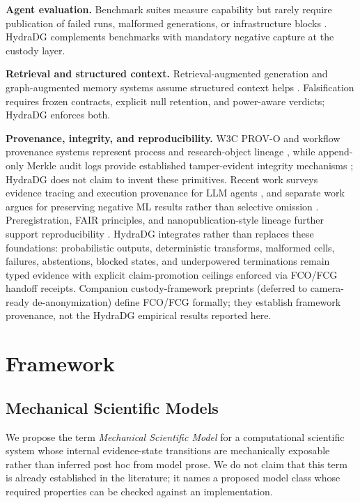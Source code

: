 \documentclass{article}
\begin{document}
\textbf{Agent evaluation.} Benchmark suites measure capability but rarely require publication of failed runs, malformed generations, or infrastructure blocks \cite{liu2023agentbench,zhou2023webarena}.
HydraDG complements benchmarks with mandatory negative capture at the custody layer.

\textbf{Retrieval and structured context.} Retrieval-augmented generation and graph-augmented memory systems assume structured context helps \cite{lewis2020rag,edge2024graphrag}.
Falsification requires frozen contracts, explicit null retention, and power-aware verdicts; HydraDG enforces both.

\textbf{Provenance, integrity, and reproducibility.}
W3C PROV-O and workflow provenance systems represent process and research-object lineage \cite{lebo2013provo,khan2019cwlprov}, while append-only Merkle audit logs provide established tamper-evident integrity mechanisms \cite{laurie2013ct}; HydraDG does not claim to invent these primitives.
Recent work surveys evidence tracing and execution provenance for LLM agents \cite{wang2026agentprovenance}, and separate work argues for preserving negative ML results rather than selective omission \cite{karl2024negative}.
Preregistration, FAIR principles, and nanopublication-style lineage further support reproducibility \cite{nosek2018prereg,wilkinson2016fair,groth2010nano}.
HydraDG integrates rather than replaces these foundations: probabilistic outputs, deterministic transforms, malformed cells, failures, abstentions, blocked states, and underpowered terminations remain typed evidence with explicit claim-promotion ceilings enforced via FCO/FCG handoff receipts.
Companion custody-framework preprints (deferred to camera-ready de-anonymization) define FCO/FCG formally; they establish framework provenance, not the HydraDG empirical results reported here.

\section{Framework}

\subsection{Mechanical Scientific Models}

We propose the term \emph{Mechanical Scientific Model} for a computational scientific system whose internal evidence-state transitions are mechanically exposable rather than inferred post hoc from model prose.
We do not claim that this term is already established in the literature; it names a proposed model class whose required properties can be checked against an implementation.
\end{document}
